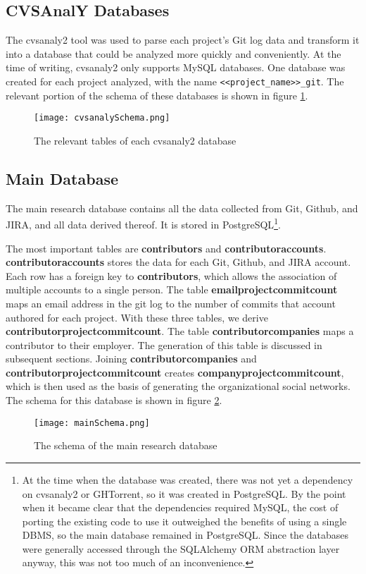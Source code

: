 \subsection{CVSAnalY Databases}
The cvsanaly2 tool\cite{cvsanaly} was used to parse each project's Git log data and transform it into a database that could be analyzed more quickly and conveniently. At the time of writing, cvsanaly2 only supports MySQL databases. One database was created for each project analyzed, with the name \verb|<<project_name>>_git|. The relevant portion of the schema of these databases is shown in figure \ref{fig:cvsanalySchema}.
\begin{figure}
	\texttt{[image: cvsanalySchema.png]}
	\centering
	\caption{The relevant tables of each cvsanaly2 database}
	\label{fig:cvsanalySchema}
\end{figure}
\subsection{Main Database}
The main research database contains all the data collected from Git, Github, and JIRA, and all data derived thereof. It is stored in PostgreSQL\footnote{At the time when the database was created, there was not yet a dependency on cvsanaly2 or GHTorrent, so it was created in PostgreSQL. By the point when it became clear that the dependencies required MySQL, the cost of porting the existing code to use it outweighed the benefits of using a single DBMS, so the main database remained in PostgreSQL. Since the databases were generally accessed through the SQLAlchemy ORM abstraction layer anyway, this was not too much of an inconvenience.}.

The most important tables are \textbf{contributors} and \textbf{contributoraccounts}. \textbf{contributoraccounts} stores the data for each Git, Github, and JIRA account. Each row has a foreign key to \textbf{contributors}, which allows the association of multiple accounts to a single person. The table \textbf{emailprojectcommitcount} maps an email address in the git log to the number of commits that account authored for each project. With these three tables, we derive \textbf{contributorprojectcommitcount}. The table \textbf{contributorcompanies} maps a contributor to their employer. The generation of this table is discussed in subsequent sections. Joining \textbf{contributorcompanies} and \textbf{contributorprojectcommitcount} creates \textbf{companyprojectcommitcount}, which is then used as the basis of generating the organizational social networks. The schema for this database is shown in figure \ref{fig:mainSchema}.
\begin{figure}
	\texttt{[image: mainSchema.png]}
	\centering
	\caption{The schema of the main research database}
	\label{fig:mainSchema}
\end{figure}

